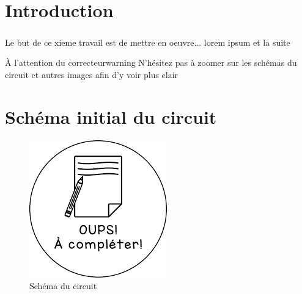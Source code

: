 \section{Introduction}

    \subparagraph{}Le but de ce xieme travail est de mettre en oeuvre... lorem ipsum et la suite \\[1.5cm]
    
    \begin{titletbox}{À l'attention du correcteur}{warning}
        N'hésitez pas à zoomer sur les schémas du circuit et autres images afin d'y voir plus clair
    \end{titletbox}

\section{Schéma initial du circuit}

    \begin{figure}[H]
        \centering
        \includegraphics[scale=0.5]{../pictures/blank.png} %
        \caption{Schéma du circuit}
    \end{figure}

